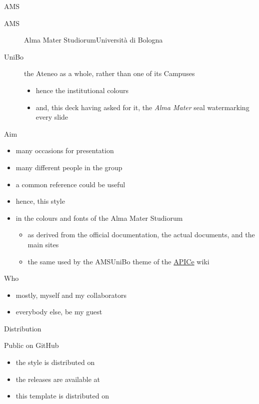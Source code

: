 \documentclass[presentation,bologna,apice]{beamer}\mode<presentation>{\usetheme{AMSUniBo}}
\begin{document}
\begin{frame}[c]{AMS}
%
\begin{description}
	\item[AMS] Alma Mater Studiorum\textendash{}Università di Bologna
	\item[UniBo] the Ateneo as a whole, rather than one of its Campuses
	\begin{itemize}
		\item hence the institutional colours
		\item and, this deck having asked for it, the \emph{Alma Mater} seal watermarking every slide
	\end{itemize}
\end{description}
%
\end{frame}

\begin{frame}[c]{Aim}
%
\begin{itemize}
	\item many occasions for presentation
	\item many different people in the group
	\item a common reference could be useful
	\item hence, this style
	\item in the colours and fonts of the Alma Mater Studiorum
	\begin{itemize}
		\item as derived from the official documentation, the actual documents, and the main sites
		\item the same used by the \alert{AMSUniBo} theme of the \href{https://apice.unibo.it/}{\textsf{APICe}} wiki
	\end{itemize}
\end{itemize}
%
\end{frame}

\begin{frame}[c]{Who}
%
\begin{itemize}
	\item mostly, myself and my collaborators
	\item everybody else, be my guest
\end{itemize}
%
\end{frame}

\begin{frame}[c]{Distribution}
%
\begin{block}{Public on GitHub}
	\begin{itemize}
		\item the style is distributed on 
		\item the releases are available at 
		\item this template is distributed on 
	\end{itemize}
\end{block}
%
\end{frame}
\end{document}
